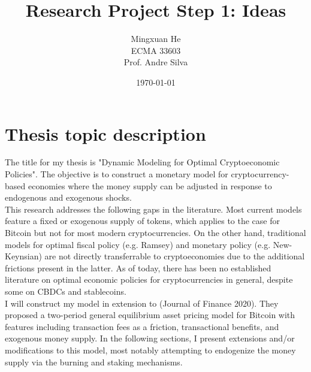 \documentclass[12pt]{article}
\begin{document}
\title{Research Project Step 1: Ideas}


\author{Mingxuan He\\
ECMA 33603\\
Prof. Andre Silva}
\date{\today}


\maketitle 



\section*{Thesis topic description}
The title for my thesis is "Dynamic Modeling for Optimal Cryptoeconomic Policies". The objective is to construct a monetary model for cryptocurrency-based economies where the money supply can be adjusted in response to endogenous and exogenous shocks.\\
This research addresses the following gaps in the literature. Most current models feature a fixed or exogenous supply of tokens, which applies to the case for Bitcoin but not for most modern cryptocurrencies. On the other hand, traditional models for optimal fiscal policy (e.g. Ramsey) and monetary policy (e.g. New-Keynsian) are not directly transferrable to cryptoeconomies due to the additional frictions present in the latter. As of today, there has been no established literature on optimal economic policies for cryptocurrencies in general, despite some on CBDCs and stablecoins. \\
I will construct my model in extension to \citeauthor{biais2020equilibrium} (Journal of Finance 2020). They proposed a two-period general equilibrium asset pricing  model for Bitcoin with features including transaction fees as a friction, transactional benefits, and exogenous money supply. In the following sections, I present extensions and/or modifications to this model, most notably attempting to endogenize the money supply via the burning and staking mechanisms.
\end{document}
